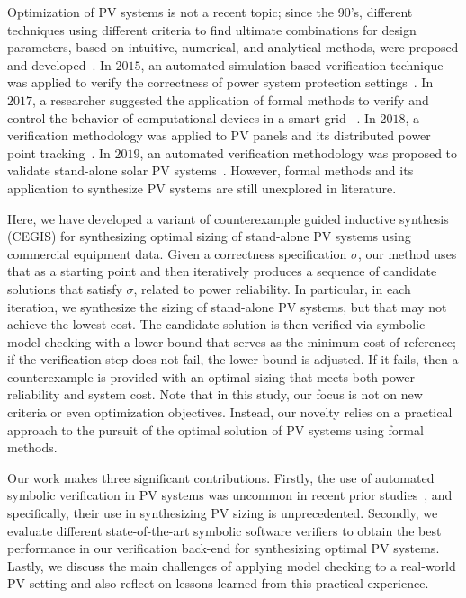 \documentclass[runningheads]{llncs}
\begin{document}
Optimization of PV systems is not a recent topic; since the 90's, different techniques using different criteria to find ultimate combinations for design parameters, based on intuitive, numerical, and analytical methods, were proposed and developed~\cite{Alsadi2018}. 
In $2015$, an automated simulation-based verification technique was applied to verify the correctness of power system protection settings~\cite{Sengupta2015}. In $2017$, a researcher suggested the application of formal methods to verify and control the behavior of computational devices in a smart grid ~\cite{Abate2017}. In $2018$, a verification methodology was applied to PV panels and its distributed power point tracking~\cite{Driouich2018}. In $2019$, an automated verification methodology was proposed to validate stand-alone solar PV systems~\cite{TrindadeCordeiro19}. However, formal methods and its application to synthesize PV systems are still unexplored in literature.

Here, we have developed a variant of counterexample guided inductive synthesis (CEGIS) for synthesizing optimal sizing of stand-alone PV systems using commercial equipment data. Given a correctness specification $\sigma$, our method uses that as a starting point and then iteratively produces a sequence of candidate solutions that satisfy $\sigma$, related to power reliability. In particular, in each iteration, we synthesize the sizing of stand-alone PV systems, but that may not achieve the lowest cost. The candidate solution is then verified via symbolic model checking with a lower bound that serves as the minimum cost of reference; if the verification step does not fail, the lower bound is adjusted. If it fails, then a counterexample is provided with an optimal sizing that meets both power reliability and system cost. Note that in this study, our focus is not on new criteria or even optimization objectives. Instead, our novelty relies on a practical approach to the pursuit of the optimal solution of PV systems using formal methods. 

Our work makes three significant contributions. Firstly, the use of automated symbolic verification in PV systems was uncommon in recent prior studies~\cite{TrindadeCordeiro19}, and specifically, their use in synthesizing PV sizing is unprecedented. Secondly, we evaluate different state-of-the-art symbolic software verifiers to obtain the best performance in our verification back-end for synthesizing optimal PV systems. Lastly, we discuss the main challenges of applying model checking to a real-world PV setting and also reflect on lessons learned from this practical experience.
\end{document}
